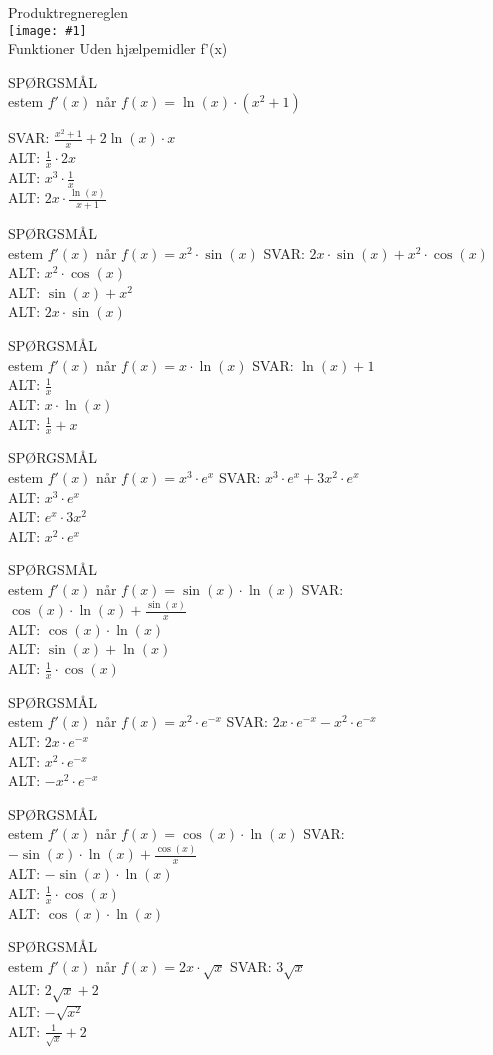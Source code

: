 \documentclass[]{article}
\newcounter{spgcounter}
\newenvironment{question}[2]{\addtocounter{spgcounter}{1} SPØRGSMÅL \thespgcounter\\}{\hspace{50px}}
\newcommand{\name}[1]{{\huge #1}\\}
\newcommand{\tag}[1]{#1}
\newcommand{\cover}[1]{\texttt{[image: \#1]}\\}
\newcommand{\answer}[1]{{\color{green} SVAR: #1}\\}
\newcommand{\alt}[1]{{\color{red} ALT: #1}\\}
\begin{document}
\name{Produktregnereglen}
\cover{produktregneregel.png}
\tag{Funktioner}
\tag{Uden hjælpemidler}
\tag{f'(x)}

\begin{question}{multi}

Bestem $f'(x)$ når $f(x)=\ln{(x)}\cdot (x^2 + 1)$

\answer{$\frac{x^2+1}{x}+2 \ln{(x)} \cdot x$}
\alt{$\frac{1}{x} \cdot 2x$}
\alt{$x^3 \cdot \frac{1}{x}$}
\alt{$2 x \cdot \frac{\ln{(x)}}{x + 1}$}

\end{question}

\begin{question}{multi}
Bestem $f'(x)$ når $f(x)=x^2 \cdot \sin(x)$
\answer{$2x \cdot \sin(x) + x^2 \cdot \cos(x)$}
\alt{$x^2 \cdot \cos(x)$}
\alt{$\sin(x) + x^2$}
\alt{$2x \cdot \sin(x)$}
\end{question}
        
\begin{question}{multi}
Bestem $f'(x)$ når $f(x)=x \cdot \ln(x)$
\answer{$\ln(x) + 1$}
\alt{$\frac{1}{x}$}
\alt{$x \cdot \ln(x)$}
\alt{$\frac{1}{x} + x$}
\end{question}
    
\begin{question}{multi}
Bestem $f'(x)$ når $f(x)=x^3 \cdot e^x$
\answer{$x^3 \cdot e^x + 3x^2 \cdot e^x$}
\alt{$x^3 \cdot e^x$}
\alt{$e^x \cdot 3x^2$}
\alt{$x^2 \cdot e^x$}
\end{question}
    
\begin{question}{multi}
Bestem $f'(x)$ når $f(x)=\sin(x) \cdot \ln(x)$
\answer{$\cos(x) \cdot \ln(x) + \frac{\sin(x)}{x}$}
\alt{$\cos(x) \cdot \ln(x)$}
\alt{$\sin(x) + \ln(x)$}
\alt{$\frac{1}{x} \cdot \cos(x)$}
\end{question}
    
\begin{question}{multi}
Bestem $f'(x)$ når $f(x)=x^2 \cdot e^{-x}$
\answer{$2x \cdot e^{-x} - x^2 \cdot e^{-x}$}
\alt{$2x \cdot e^{-x}$}
\alt{$x^2 \cdot e^{-x}$}
\alt{$-x^2 \cdot e^{-x}$}
\end{question}
    
\begin{question}{multi}
Bestem $f'(x)$ når $f(x)=\cos(x) \cdot \ln(x)$
\answer{$-\sin(x) \cdot \ln(x) + \frac{\cos(x)}{x}$}
\alt{$-\sin(x) \cdot \ln(x)$}
\alt{$\frac{1}{x} \cdot \cos(x)$}
\alt{$\cos(x) \cdot \ln(x)$}
\end{question}
    
\begin{question}{multi}
Bestem $f'(x)$ når $f(x)=2 x \cdot \sqrt{x}$
\answer{$3 \sqrt{x}$}
\alt{$2 \sqrt{x} + 2$}
\alt{$-\sqrt{x^2}$}
\alt{$\frac{1}{\sqrt{x}} + 2$}
\end{question}
\end{document}

